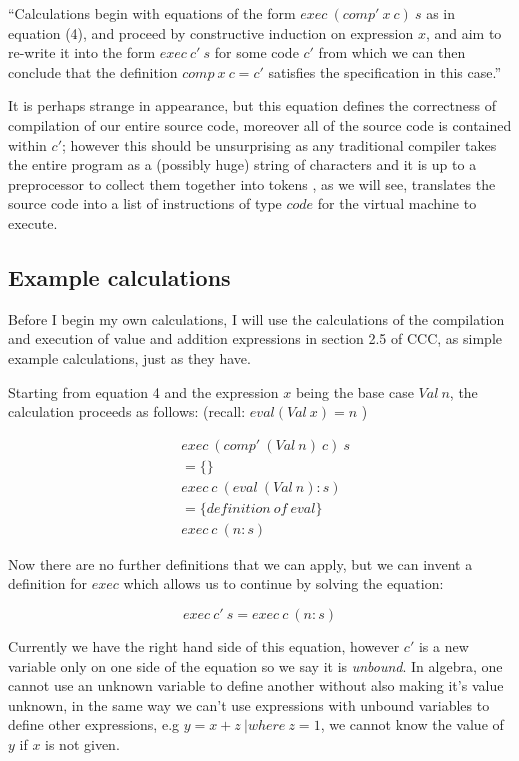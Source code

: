 \documentclass {article}
\begin{document}
``Calculations begin with equations
of the form $exec \  (comp' \  x \  c) \  s$
as in equation (4),
and proceed by constructive induction on 
expression $x$, 
and aim to re-write it into the form
$exec \  c' \  s$ for some code $c'$
from which we can then conclude that the definition
$comp \  x \  c = c'$ satisfies the 
specification in this case.''\cite{bandh}

It is perhaps strange in appearance,
but this equation
defines the correctness of compilation of our entire source code,
moreover all of the source code is contained within $c'$;
however this should be unsurprising as any traditional compiler
takes the entire program as a (possibly huge) string of characters
and it is up to a preprocessor to collect them together into tokens \cite{dragon}
\comp, as we will see, translates the source code into a
list of instructions of type $code$ for the virtual machine to execute.

\subsection{Example calculations}

Before I begin my own calculations,
I will use the
calculations of the compilation and execution
of value and addition expressions in
section 2.5 of CCC, as simple example
calculations, just as they have.

Starting from equation 4 and the expression $x$
being the base case $Val  \ n$, 
the calculation proceeds as follows\cite{bandh}:
(recall: \( eval (Val \  x) = n  \) )

\begin{align*}
	&exec \ (comp' \ (Val \ n) \ c) \ s \\
	&= \{ \} \\
	&exec \ c \ (eval \ (Val \ n) : s) \\
	&= \{definition \ of \ eval\} \\
	&exec \ c \ (n:s)
\end{align*}

Now there are no further definitions that we can apply,
but we can invent a definition for $exec$ which allows
us to continue by solving the equation:

\[ exec \ c' \ s = exec \ c \ (n : s) \]

Currently we have the right hand side of this equation,
however $c'$ is a new variable only on one side of the equation
so we say it is \emph{unbound}.
In algebra, one cannot use an unknown variable to define
another without also making it's value unknown,
in the same way we can't use expressions with
unbound variables to define other expressions,
e.g \(y = x + z \ | where \ z = 1\), we cannot
know the value of $y$ if $x$ is not given.
\end{document}
